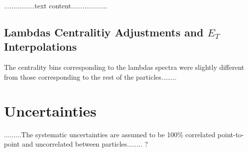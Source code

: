  ................text content...................
 
\subsection{Lambdas Centralitiy Adjustments and $E_{T}$ Interpolations}
The centrality bins corresponding to the lambdas spectra were slightly different from those corresponding to the rest of the particles........
\section{Uncertainties}
.........The systematic uncertainties are assumed to be 100\% correlated point-to-point and uncorrelated between particles........ ?
